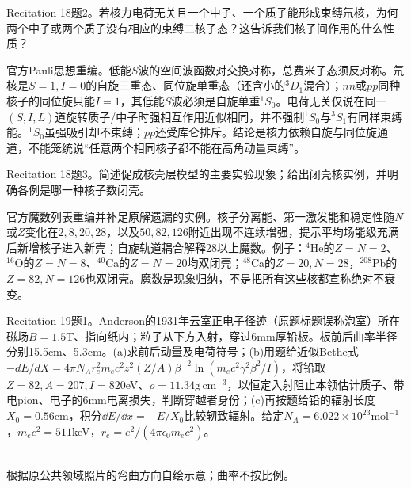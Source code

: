 \begin{exercise}\label{ex:rec-18-2}
Recitation 18题2。若核力电荷无关且一个中子、一个质子能形成束缚氘核，为何两个中子或两个质子没有相应的束缚二核子态？这告诉我们核子间作用的什么性质？
\end{exercise}
\begin{solution}
官方Pauli思想重编。低能$S$波的空间波函数对交换对称，总费米子态须反对称。氘核是$S=1,I=0$的自旋三重态、同位旋单重态（还含小的${}^3D_1$混合）；$nn$或$pp$同种核子的同位旋只能$I=1$，其低能$S$波必须是自旋单重${}^1S_0$。电荷无关仅说在同一$(S,I,L)$道旋转质子/中子时强相互作用近似相同，并不强制${}^1S_0$与${}^3S_1$有同样束缚能。${}^1S_0$虽强吸引却不束缚；$pp$还受库仑排斥。结论是核力依赖自旋与同位旋通道，不能笼统说“任意两个相同核子都不能在高角动量束缚”。
\end{solution}
\begin{exercise}\label{ex:rec-18-3}
Recitation 18题3。简述促成核壳层模型的主要实验现象；给出闭壳核实例，并明确各例是哪一种核子数闭壳。
\end{exercise}
\begin{solution}
官方魔数列表重编并补足原解遗漏的实例。核子分离能、第一激发能和稳定性随$N$或$Z$变化在$2,8,20,28$，以及$50,82,126$附近出现不连续增强，提示平均场能级充满后新增核子进入新壳；自旋轨道耦合解释28以上魔数。例子：$^4$He的$Z=N=2$、$^{16}$O的$Z=N=8$、$^{40}$Ca的$Z=N=20$均双闭壳；$^{48}$Ca的$Z=20,N=28$，$^{208}$Pb的$Z=82,N=126$也双闭壳。魔数是现象归纳，不是把所有这些核都宣称绝对不衰变。
\end{solution}
\begin{exercise}\label{ex:rec-19-1}
Recitation 19题1。Anderson的1931年云室正电子径迹（原题标题误称泡室）所在磁场$B=1.5$T、指向纸内；粒子从下方入射，穿过6mm厚铅板。板前后曲率半径分别15.5cm、5.3cm。(a)求前后动量及电荷符号；(b)用题给近似Bethe式$-dE/dX=4\pi N_A r_e^2m_ec^2z^2(Z/A)\beta^{-2}\ln(m_ec^2\gamma^2\beta^2/I)$，将铅取$Z=82,A=207,I=820$eV、$\rho=11.34\mathrm{g\,cm^{-3}}$，以恒定入射阻止本领估计质子、带电pion、电子的6mm电离损失，判断穿越者身份；(c)再按题给铅的辐射长度$X_0=0.56$cm，积分$\dd E/\dd x=-E/X_0$比较轫致辐射。给定$N_A=6.022\times10^{23}\mathrm{mol}^{-1}$，$m_ec^2=511$keV，$r_e=e^2/(4\pi\epsilon_0m_ec^2)$。
\end{exercise}
\begin{center}\\[-2pt]
{\small 根据原公共领域照片的弯曲方向自绘示意；曲率不按比例。}
\end{center}

